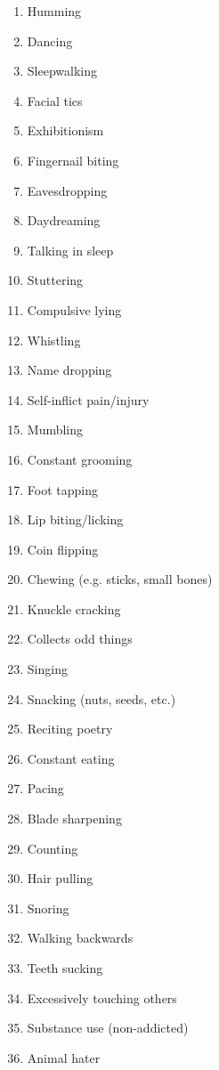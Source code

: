 \documentclass[12pt]{book}  %
\begin{document}
\begin{multicols}{2} %
    \begin{enumerate}
        \item Humming
        \item Dancing
        \item Sleepwalking
        \item Facial tics
        \item Exhibitionism
        \item Fingernail biting
        \item Eavesdropping
        \item Daydreaming
        \item Talking in sleep
        \item Stuttering
        \item Compulsive lying
        \item Whistling
        \item Name dropping
        \item Self-inflict pain/injury
        \item Mumbling
        \item Constant grooming
        \item Foot tapping
        \item Lip biting/licking
        \item Coin flipping
        \item Chewing (e.g. sticks, small bones)
        \item Knuckle cracking
        \item Collects odd things
        \item Singing
        \item Snacking (nuts, seeds, etc.)
        \item Reciting poetry
        \item Constant eating
        \item Pacing
        \item Blade sharpening
        \item Counting
        \item Hair pulling
        \item Snoring
        \item Walking backwards
        \item Teeth sucking
        \item Excessively touching others
        \item Substance use (non-addicted)
        \item Animal hater

\end{enumerate}
\end{multicols}
\end{document}
